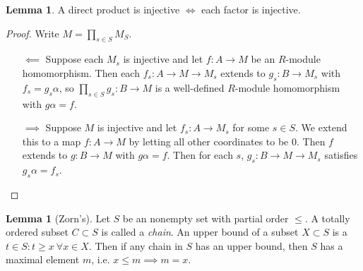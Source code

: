 \documentclass{article}
\theoremstyle{definition}
\newtheorem{lemma}[defn]{Lemma}
\begin{document}
\begin{lemma}
\label{lemma:dirprodisinjifffactisinj}
A direct product is injective $\iff$ each factor is injective.
\end{lemma}
\begin{proof}
Write $M=\prod_{s\in S}M_S$.
\begin{itemize}
\item[$\impliedby$] Suppose each $M_s$ is injective and let $f:A\rightarrow M$ be an $R$-module homomorphism. Then each $f_s:A\rightarrow M\rightarrow M_s$ extends to $g_s:B\rightarrow M_s$ with $f_s=g_s\alpha$, so $\prod_{s\in S}g_s:B\rightarrow M$ is a well-defined $R$-module homomorphism with $g\alpha=f$.
\item[$\implies$] Suppose $M$ is injective and let $f_s:A\rightarrow M_s$ for some $s\in S$. We extend this to a map $f:A\rightarrow M$ by letting all other coordinates to be 0. Then $f$ extends to $g:B\rightarrow M$ with $g\alpha=f$. Then for each $s$, $g_s:B\rightarrow M\rightarrow M_s$ satisfies $g_s\alpha=f_s$.
\end{itemize}
\end{proof}

\begin{lemma}[Zorn's]
Let $S$ be an nonempty set with partial order $\leq$. A totally ordered subset $C\subset S$ is called a \textit{chain}. An upper bound of a subset $X\subset S$ is a $t\in S:t\geq x \ \forall x\in X$. Then if any chain in $S$ has an upper bound, then $S$ has a maximal element $m$, i.e. $x\leq m\implies m=x$.
\end{lemma}
\end{document}
